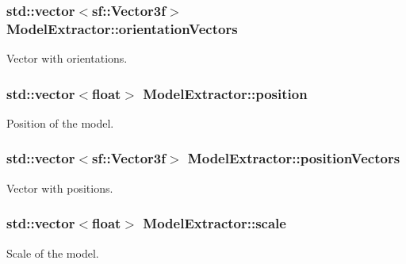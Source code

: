 \subsubsection[{\texorpdfstring{orientation\+Vectors}{orientationVectors}}]{\setlength{\rightskip}{0pt plus 5cm}std\+::vector$<$sf\+::\+Vector3f$>$ Model\+Extractor\+::orientation\+Vectors\hspace{0.3cm}{\ttfamily [private]}}\hypertarget{class_model_extractor_a619bae88ba670b8652dc608a482b23fc}{}\label{class_model_extractor_a619bae88ba670b8652dc608a482b23fc}
Vector with orientations. 
\subsubsection[{\texorpdfstring{position}{position}}]{\setlength{\rightskip}{0pt plus 5cm}std\+::vector$<$float$>$ Model\+Extractor\+::position\hspace{0.3cm}{\ttfamily [private]}}\hypertarget{class_model_extractor_a561a692a6b37b8ef36020b918a63066c}{}\label{class_model_extractor_a561a692a6b37b8ef36020b918a63066c}
Position of the model. 
\subsubsection[{\texorpdfstring{position\+Vectors}{positionVectors}}]{\setlength{\rightskip}{0pt plus 5cm}std\+::vector$<$sf\+::\+Vector3f$>$ Model\+Extractor\+::position\+Vectors\hspace{0.3cm}{\ttfamily [private]}}\hypertarget{class_model_extractor_a9427f6c960e71ea44371014aa12835cf}{}\label{class_model_extractor_a9427f6c960e71ea44371014aa12835cf}
Vector with positions. 
\subsubsection[{\texorpdfstring{scale}{scale}}]{\setlength{\rightskip}{0pt plus 5cm}std\+::vector$<$float$>$ Model\+Extractor\+::scale\hspace{0.3cm}{\ttfamily [private]}}\hypertarget{class_model_extractor_ae9815e4d0f6783e6ba92961956c7d932}{}\label{class_model_extractor_ae9815e4d0f6783e6ba92961956c7d932}
Scale of the model. 
